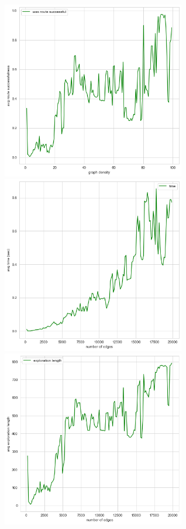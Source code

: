 \documentclass{article}
\begin{document}
\begin{landscape}
\begin{figure}
  \centering
  \includegraphics[width=8cm]{figures/random_uj/edge_den_succ.png}
  \hspace{1cm}
  \includegraphics[width=8cm]{figures/random_uj/edge_time.png}
  \hspace{1cm}
  \includegraphics[width=8cm]{figures/random_uj/edge_expl.png}
  \vspace{1cm}


\end{figure}
\end{landscape}
\end{document}
